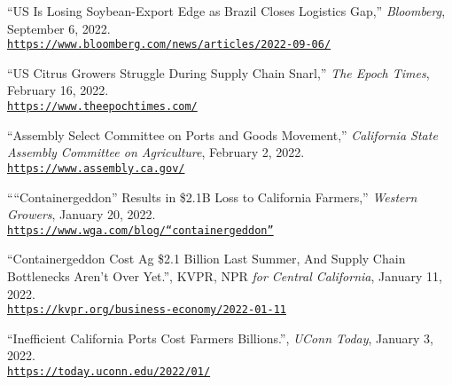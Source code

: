\documentclass[10.5 pt,letterpaper]{article}
\renewenvironment{itemize}{
	\begin{list}{}{
			\setlength{\leftmargin}{1.5em}
		}
	}{
	\end{list}
}
\begin{document}
\begin{itemize}
	
		
\item[-] ``US Is Losing Soybean-Export Edge as Brazil Closes Logistics Gap,'' \textit{Bloomberg}, September 6, 2022.     \\	\href{https://www.bloomberg.com/news/articles/2022-09-06/us-losing-soybean-export-edge-as-brazil-closes-logistics-gap?leadSource=uverify%20wall}{\texttt{https://www.bloomberg.com/news/articles/2022-09-06/}}



	\item[-] ``US Citrus Growers Struggle During Supply Chain Snarl,'' \textit{The Epoch Times}, February 16, 2022.     \\	\href{https://www.theepochtimes.com/u-s-citrus-growers-struggle-during-supply-chain-snarl_4283693.html}{\texttt{https://www.theepochtimes.com/}}
	
	
	
	
	\item[-] ``Assembly Select Committee on Ports and Goods Movement,'' \textit{California State Assembly	Committee on Agriculture}, February 2, 2022.     \\	\href{https://www.assembly.ca.gov/sites/assembly.ca.gov/files/ag_export_briefing_document_final.pdf}{\texttt{https://www.assembly.ca.gov/}}
	
	
	
	\item[-] ````Containergeddon'' Results in \$2.1B Loss to California Farmers,'' \textit{Western Growers}, January 20, 2022.     \\	\href{https://www.wga.com/blog/“containergeddon”-results-21b-loss-california-farmers}{\texttt{https://www.wga.com/blog/“containergeddon”}}
	
	
	\item[-] ``Containergeddon Cost Ag \$2.1 Billion Last Summer, And Supply Chain Bottlenecks Aren’t Over Yet.'', KVPR, NPR \textit{for Central California}, January 11, 2022.     \\  
	\href{https://kvpr.org/business-economy/2022-01-11/containergeddon-cost-ag-2- 1-billion-last-summer-and-supply-chain-bottlenecks-arent-over-yet}{\texttt{https://kvpr.org/business-economy/2022-01-11}}
	
	
	
	
		
	\item[-] ``Inefficient California Ports Cost Farmers Billions.'', \textit{UConn Today}, January 3, 2022.     \\	\href{https://today.uconn.edu/2022/01/inefficient-california-ports-cost-farmers-billions/}{\texttt{https://today.uconn.edu/2022/01/}}
	
	
	
	

	
	
\end{itemize}
 
\end{document}
